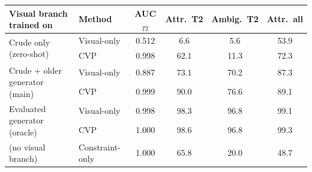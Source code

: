 \begin{tabular}{llcccc}
\toprule
Visual branch trained on & Method & AUC$_{T2}$ & Attr.\ T2 & Ambig.\ T2 & Attr.\ all\\
\midrule
\multirow{2}{*}{Crude only (zero-shot)} & Visual-only & 0.512 & 6.6 & 5.6 & 53.9\\
 & CVP & 0.998 & 62.1 & 11.3 & 72.3\\
\midrule
\multirow{2}{*}{Crude + older generator (main)} & Visual-only & 0.887 & 73.1 & 70.2 & 87.3\\
 & CVP & 0.999 & 90.0 & 76.6 & 89.1\\
\midrule
\multirow{2}{*}{Evaluated generator (oracle)} & Visual-only & 0.998 & 98.3 & 96.8 & 99.1\\
 & CVP & 1.000 & 98.6 & 96.8 & 99.3\\
\midrule
(no visual branch) & Constraint-only & 1.000 & 65.8 & 20.0 & 48.7\\
\bottomrule
\end{tabular}
